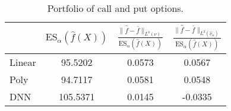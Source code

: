 \begin{table}[ht]
\centering
\begin{tabular}{lccc}
\toprule
 & $\mathrm{ES}_{\alpha}(\hat{f}(X))$ & $\frac{\|\hat f - \bar f\|_{L^2(\nu)}}{\mathrm{ES}_{\alpha}(\hat{f}(X))}$ & $\frac{\|\hat f - \bar f\|_{L^2(\hat \nu_\alpha)}}{\mathrm{ES}_{\alpha}(\hat{f}(X))}$ \\
\midrule
Linear & 95.5202 & 0.0573 & 0.0567 \\
Poly & 94.7117 & 0.0581 & 0.0548 \\
DNN & 105.5371 & 0.0145 & -0.0335 \\
\bottomrule
\end{tabular}
\caption{Portfolio of call and put options.}
\end{table}
